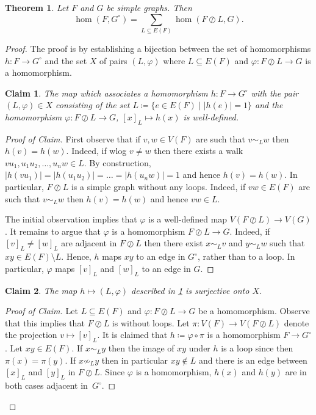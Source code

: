 \documentclass[3p,final]{elsarticle}
\renewcommand\phi\varphi
\newtheorem{theorem}{Theorem}
\newtheorem{claim}{Claim}[theorem]
\newenvironment{claimproof}[1][Proof of Claim]{\begin{proof}[#1] \renewcommand{\qedsymbol}{$\lrcorner$}}{ \end{proof}}
\begin{document}
	\begin{theorem} \label{lem:looping}
		Let $F$ and $G$ be simple graphs. Then
		\[
		\hom(F, G^\circ) = \sum_{L \subseteq E(F)} \hom(F \oslash L, G).
		\]
	\end{theorem}
	\begin{proof}%
	The proof is by establishing a bijection between the set of homomorphisms $h \colon F \to G^\circ$ and the set $X$ of pairs $(L, \phi)$ where $L \subseteq E(F)$ and $\phi \colon F \oslash L \to G$ is a homomorphism.	
	
	\begin{claim} \label{cl:looping-map}
		The map which associates a homomorphism $h \colon F \to G^\circ$ with the pair $(L, \phi) \in X$ consisting of the set $L \coloneqq \{e \in E(F) \mid |h(e)| = 1\}$ and the homomorphism $\phi \colon F \oslash L \to G$, $[x]_L \mapsto h(x)$ is well-defined.
	\end{claim}
	\begin{claimproof}
		First observe that if $v,w  \in V(F)$ are such that $v \sim_L w$ then $h(v) = h(w)$. Indeed, if wlog $v \neq w$ then there exists a walk $vu_1, u_1u_2, \dots, u_nw \in L$. By construction, $|h(vu_1)| = |h(u_1u_2)| = \dots = |h(u_nw)| = 1$ and hence $h(v) = h(w)$.
		In particular, $F \oslash L$ is a simple graph without any loops. Indeed, if $vw \in E(F)$ are such that $v \sim_L w$ then $h(v) = h(w)$ and hence $vw \in L$.
		
		The initial observation implies that $\phi$ is a well-defined map $V(F \oslash L) \to V(G)$. It remains to argue that $\phi$ is a homomorphism $F  \oslash L \to G$. 
		Indeed, if $[v]_L \neq [w]_L$ are adjacent in $F \oslash L$ then there exist $x \sim_L v$ and $y \sim_L w$ such that $xy \in E(F) \setminus L$. Hence, $h$ maps $xy$ to an edge in $G^\circ$, rather than to a loop. In particular, $\phi$ maps $[v]_L$ and $[w]_L$ to an edge in $G$.
	\end{claimproof}
	
	\begin{claim}
		The map $h \mapsto (L, \phi)$ described in \cref{cl:looping-map} is surjective onto $X$.
	\end{claim}
	\begin{claimproof}
		Let $L \subseteq E(F)$ and $\phi \colon F \oslash L \to G$ be a homomorphism. Observe that this implies that $F \oslash L$ is without loops. 
		Let $\pi \colon V(F) \to V(F \oslash L)$ denote the projection $v \mapsto [v]_L$.
		It is claimed that $h \coloneqq \phi \circ \pi$ is a homomorphism $F \to G^\circ$. Let $xy \in E(F)$. If $x \sim_L y$ then the image of $xy$ under $h$ is a loop since then $\pi(x) = \pi(y)$.
		If $x \not\sim_L y$ then in particular $xy \not\in L$ and there is an edge between $[x]_L$ and $[y]_L$ in $F \oslash L$. Since $\phi$ is a homomorphism, $h(x)$ and $h(y)$ are in both cases adjacent in~$G^\circ$.
		

\end{claimproof}
\end{proof}
\end{document}
